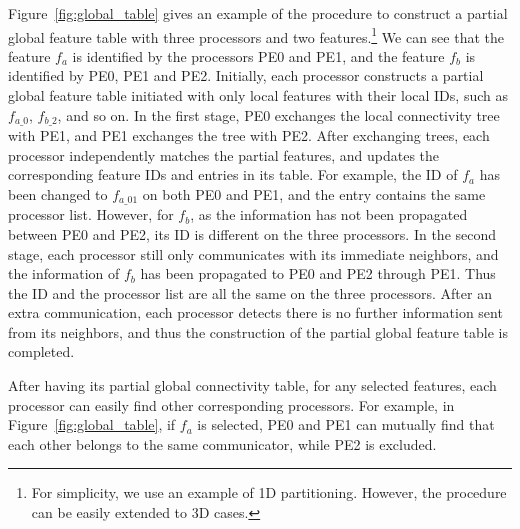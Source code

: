 Figure~\ref{fig:global_table} gives an example of the procedure to construct a partial global feature table with three processors and two features.\footnote{For simplicity, we use an example of 1D partitioning. However, the procedure can be easily extended to 3D cases.} We can see that the feature $f_a$ is identified by the processors PE0 and PE1, and the feature $f_b$ is identified by PE0, PE1 and PE2. Initially, each processor constructs a partial global feature table initiated with only local features with their local IDs, such as $f_{a\_0}$, $f_{b\_2}$, and so on. In the first stage, PE0 exchanges the local connectivity tree with PE1, and PE1 exchanges the tree with PE2. After exchanging trees, each processor independently matches the partial features, and updates the corresponding feature IDs and entries in its table. For example, the ID of $f_a$ has been changed to $f_{a\_01}$ on both PE0 and PE1, and the entry contains the same processor list. However, for $f_b$, as the information has not been propagated between PE0 and PE2, its ID is different on the three processors. In the second stage, each processor still only communicates with its immediate neighbors, and the information of $f_b$ has been propagated to PE0 and PE2 through PE1. Thus the ID and the processor list are all the same on the three processors. After an extra communication, each processor detects there is no further information sent from its neighbors, and thus the construction of the partial global feature table is completed.

After having its partial global connectivity table, for any selected features, each processor can easily find other corresponding processors. For example, in Figure~\ref{fig:global_table}, if $f_a$ is selected, PE0 and PE1 can mutually find that each other belongs to the same communicator, while PE2 is excluded.


%
%

